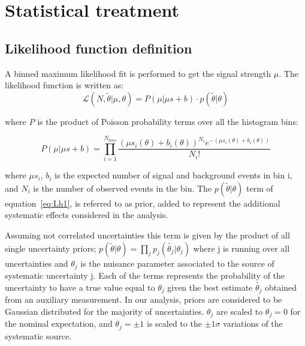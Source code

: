 \chapter{Statistical treatment}

\section{Likelihood function definition}
A binned maximum likelihood fit is performed to get the signal strength $\mu$. The likelihood function is written as:
\begin{equation} \label{eq:Lh1}
\mathcal{L}\left( N, \tilde{\theta} | \mu, \theta \right)=  P\left( \mu | \mu s +b \right) \cdot p\left( \tilde{\theta} | \theta \right)
 \end{equation}

 where $P$ is the product of Poisson probability terms over all the histogram bins:

 \begin{equation} \label{eq:Lh2}
 P\left( \mu | \mu s +b \right)  =  \prod_{i=1}^{N_{bins}} \frac{{ (\mu s_{i} (\theta)+ b_{i}(\theta))^{N_{i}} e^{ - (\mu s_{i}(\theta) + b_{i}(\theta))} } }{{N_{i}!}}
 \end{equation}

where $\mu s_{i }$, $b_{i }$ is the expected number of signal and background events in bin i, and $N_{i}$ is the number of observed events in the bin. 
The $p\left( \tilde{\theta} | \theta \right)$ term of equation~\ref{eq:Lh1}, is referred to as prior, added to represent the additional systematic effects considered in the analysis. 

Assuming not correlated uncertainties this term is given by the product of all single uncertainty priors; $ p\left( \tilde{\theta} | \theta \right) =  \prod_{j}p_{j}\left( \tilde{\theta_{j}} | \theta_{j} \right)$ where j is running over all uncertainties and  $\theta_{j}$ is the nuisance parameter associated to the source of systematic uncertainty j. Each of the terms represents the probability of the uncertainty to have a true value equal to $\theta_{j}$ given the best estimate $ \tilde{\theta_j}$ obtained from an auxiliary measurement. 
In our analysis, priors are considered to be Gaussian distributed for the majority of uncertainties. $\theta_{j} $ are scaled to $\theta_{j} =0$ for the nominal expectation, and $\theta_{j} = \pm 1$ is scaled to the $\pm 1 \sigma$ variations of the systematic source.


